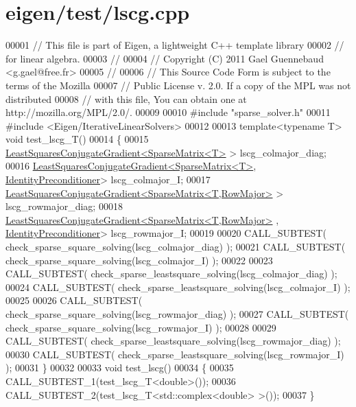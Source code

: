 \hypertarget{eigen_2test_2lscg_8cpp_source}{}\section{eigen/test/lscg.cpp}
\label{eigen_2test_2lscg_8cpp_source}

\begin{DoxyCode}
00001 \textcolor{comment}{// This file is part of Eigen, a lightweight C++ template library}
00002 \textcolor{comment}{// for linear algebra.}
00003 \textcolor{comment}{//}
00004 \textcolor{comment}{// Copyright (C) 2011 Gael Guennebaud <g.gael@free.fr>}
00005 \textcolor{comment}{//}
00006 \textcolor{comment}{// This Source Code Form is subject to the terms of the Mozilla}
00007 \textcolor{comment}{// Public License v. 2.0. If a copy of the MPL was not distributed}
00008 \textcolor{comment}{// with this file, You can obtain one at http://mozilla.org/MPL/2.0/.}
00009 
00010 \textcolor{preprocessor}{#include "sparse\_solver.h"}
00011 \textcolor{preprocessor}{#include <Eigen/IterativeLinearSolvers>}
00012 
00013 \textcolor{keyword}{template}<\textcolor{keyword}{typename} T> \textcolor{keywordtype}{void} test\_lscg\_T()
00014 \{
00015   \hyperlink{group___iterative_linear_solvers___module_class_eigen_1_1_least_squares_conjugate_gradient}{LeastSquaresConjugateGradient<SparseMatrix<T>} > 
      lscg\_colmajor\_diag;
00016   \hyperlink{group___iterative_linear_solvers___module_class_eigen_1_1_least_squares_conjugate_gradient}{LeastSquaresConjugateGradient<SparseMatrix<T>}, 
      \hyperlink{group___iterative_linear_solvers___module_class_eigen_1_1_identity_preconditioner}{IdentityPreconditioner}> lscg\_colmajor\_I;
00017   \hyperlink{group___iterative_linear_solvers___module_class_eigen_1_1_least_squares_conjugate_gradient}{LeastSquaresConjugateGradient<SparseMatrix<T,RowMajor>}
       > lscg\_rowmajor\_diag;
00018   \hyperlink{group___iterative_linear_solvers___module_class_eigen_1_1_least_squares_conjugate_gradient}{LeastSquaresConjugateGradient<SparseMatrix<T,RowMajor>}
      , \hyperlink{group___iterative_linear_solvers___module_class_eigen_1_1_identity_preconditioner}{IdentityPreconditioner}> lscg\_rowmajor\_I;
00019 
00020   CALL\_SUBTEST( check\_sparse\_square\_solving(lscg\_colmajor\_diag)  );
00021   CALL\_SUBTEST( check\_sparse\_square\_solving(lscg\_colmajor\_I)     );
00022   
00023   CALL\_SUBTEST( check\_sparse\_leastsquare\_solving(lscg\_colmajor\_diag)  );
00024   CALL\_SUBTEST( check\_sparse\_leastsquare\_solving(lscg\_colmajor\_I)     );
00025 
00026   CALL\_SUBTEST( check\_sparse\_square\_solving(lscg\_rowmajor\_diag)  );
00027   CALL\_SUBTEST( check\_sparse\_square\_solving(lscg\_rowmajor\_I)     );
00028 
00029   CALL\_SUBTEST( check\_sparse\_leastsquare\_solving(lscg\_rowmajor\_diag)  );
00030   CALL\_SUBTEST( check\_sparse\_leastsquare\_solving(lscg\_rowmajor\_I)     );
00031 \}
00032 
00033 \textcolor{keywordtype}{void} test\_lscg()
00034 \{
00035   CALL\_SUBTEST\_1(test\_lscg\_T<double>());
00036   CALL\_SUBTEST\_2(test\_lscg\_T<std::complex<double> >());
00037 \}
\end{DoxyCode}

